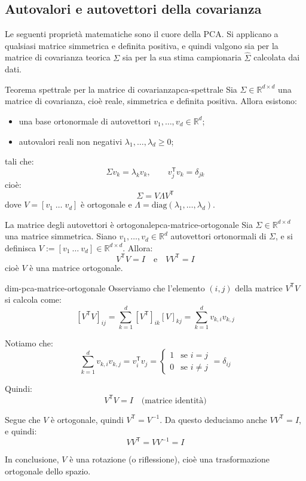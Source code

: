 \subsection{Autovalori e autovettori della covarianza}

Le seguenti proprietà matematiche sono il cuore della PCA. Si applicano a
qualsiasi matrice simmetrica e definita positiva, e quindi valgono sia per la
matrice di covarianza teorica \(\Sigma\) sia per la sua stima campionaria
\(\hat{\Sigma}\) calcolata dai dati.

\begin{teorema}{Teorema spettrale per la matrice di covarianza}{pca-spettrale}
Sia \( \Sigma \in \mathbb{R}^{d \times d} \) una matrice di covarianza, cioè
reale, simmetrica e definita positiva. Allora esistono:
\begin{itemize}
  \item una base ortonormale di autovettori \( v_1, \dots, v_d \in \mathbb{R}^d
  \);
  \item autovalori reali non negativi \( \lambda_1, \dots, \lambda_d \geq 0 \);
\end{itemize}
tali che:
\[
\Sigma v_k = \lambda_k v_k, \qquad v_j^\mathsf{T} v_k = \delta_{jk}
\]
cioè:
\[
\Sigma = V \Lambda V^\mathsf{T}
\]
dove \( V = [v_1 \; \dots \; v_d] \) è ortogonale e \( \Lambda =
\mathrm{diag}(\lambda_1, \dots, \lambda_d) \).
\end{teorema}

\begin{proposizione}{La matrice degli autovettori è
ortogonale}{pca-matrice-ortogonale}
Sia \( \Sigma \in \mathbb{R}^{d \times d} \) una matrice simmetrica. Siano \(
v_1, \dots, v_d \in \mathbb{R}^d \) autovettori ortonormali di \( \Sigma \), e
si definisca \( V := [v_1 \ \dots \ v_d] \in \mathbb{R}^{d \times d} \). Allora:
\[
V^\mathsf{T} V = I \quad \text{e} \quad VV^\mathsf{T} = I
\]
cioè \( V \) è una matrice ortogonale.
\end{proposizione}

\begin{dimostrazione}{}{dim-pca-matrice-ortogonale}
Osserviamo che l’elemento \( (i, j) \) della matrice \( V^\mathsf{T} V \) si
calcola come:
\[
[V^\mathsf{T} V]_{ij} = \sum_{k=1}^d [V^\mathsf{T}]_{ik} [V]_{kj}
= \sum_{k=1}^d v_{k,i} v_{k,j}
\]

Notiamo che:
\[
\sum_{k=1}^d v_{k,i} v_{k,j} = v_i^\mathsf{T} v_j =
\begin{cases}
1 & \text{se } i = j \\
0 & \text{se } i \neq j
\end{cases}
= \delta_{ij}
\]

Quindi:
\[
V^\mathsf{T} V = I \quad \text{(matrice identità)}
\]

Segue che \( V \) è ortogonale, quindi \( V^\mathsf{T} = V^{-1} \).
Da questo deduciamo anche \( VV^\mathsf{T} = I \), e quindi:
\[
VV^\mathsf{T} = V V^{-1} = I
\]

In conclusione, \( V \) è una rotazione (o riflessione), cioè una
trasformazione ortogonale dello spazio.
\end{dimostrazione}

